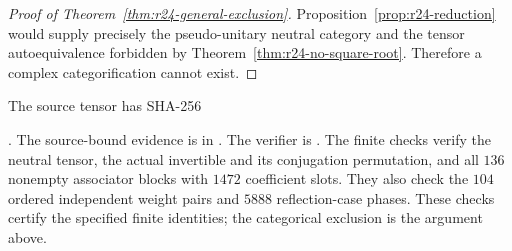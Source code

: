 \begin{proof}[Proof of Theorem~\ref{thm:r24-general-exclusion}]
Proposition~\ref{prop:r24-reduction} would supply precisely the
pseudo-unitary neutral category and the tensor autoequivalence forbidden
by Theorem~\ref{thm:r24-no-square-root}. Therefore a complex
categorification cannot exist.
\end{proof}

The source tensor has SHA-256
\par\noindent{}.
The source-bound evidence is in
.
The verifier is .
The finite checks verify the
neutral tensor, the actual invertible and its conjugation permutation,
and all $136$ nonempty associator blocks with $1472$ coefficient slots.
They also check the $104$ ordered independent weight pairs and $5888$
reflection-case phases. These checks certify the specified finite
identities; the categorical exclusion is the argument above.
